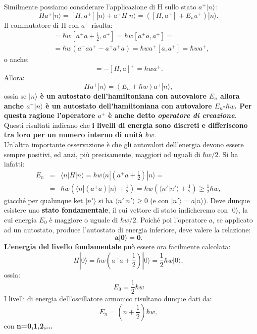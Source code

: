 \documentclass[a4paper,12pt,oneside]{book}
\begin{document}
 Similmente possiamo considerare l'applicazione di H sullo stato $a^+|n\rangle$:
	\begin{equation}
		Ha^+|n\rangle= [H,a^+]|n\rangle+a^+H|n\rangle=([H,a^+]+E_na^+)|n\rangle.
	\end{equation}
Il commutatore di H con $a^+$ risulta:
	\begin{align}
		[H,a^+]&= \hbar w[a^+a+\frac{1}{2},a^+]=\hbar w [a^+a,a^+]= \nonumber\\
		&= \hbar w (a^+aa^+-a^+a^+a)=\hbar w a^+ [a,a^+]=\hbar wa^+,
	\end{align}
o anche:
\begin{equation}
[H,a^+]=-[H,a]^+=\hbar w a^+.
\end{equation}
Allora:
\begin{equation}
Ha^+|n\rangle=(E_n+\hbar w)a^+|n\rangle,
\end{equation}
ossia se \textbf{$|n\rangle$ è un autostato dell'hamiltoniana con autovalore $E_n$ allora anche $a^+|n\rangle$ è  un autostato dell'hamiltoniana con autovalore $E_n$-$\hbar w$. Per questa ragione l'operatore $a^+$ è anche detto \textit{operatore di creazione}}. \\ 
 Questi risultati indicano che \textbf{i livelli di energia sono discreti e differiscono tra loro per un numero interno di unità $\hbar w$}.\\
 Un'altra importante osservazione è che gli autovalori dell'energia devono essere sempre positivi, ed anzi, più precisamente, maggiori od uguali di $\hbar w/2$. Si ha infatti:
\begin{eqnarray}
	E_n&=&\langle n|H|n \rangle= \hbar w \langle n|(a^+a+\frac{1}{2})|n\rangle= \nonumber \\
	&=&\hbar w (\langle n|(a^+a)|n\rangle+\frac{1}{2})=\hbar w (\langle n'|n'\rangle+\frac{1}{2}) \geq \frac{1}{2} \hbar w, 
\end{eqnarray}
giacché per qualunque ket $|n'\rangle$ si ha $\langle n'|n' \rangle\geq 0$ (e con $|n'\rangle= a|n\rangle$).
Deve dunque esistere uno \textbf{stato fondamentale}, il cui vettore di stato indicheremo con $|0\rangle$, la cui energia $E_0$ è maggiore o uguale di $\hbar w/2$. Poiché poi l'operatore $a$, se applicato ad un autostato, produce l'autostato di energia inferiore, deve valere la relazione:
\begin{equation}  \label{eq:cap11_7}
\mathbf{a|0\rangle=0}.
\end{equation}
 \textbf{L'energia del livello fondamentale} può essere ora facilmente calcolata:
\begin{equation}
H|0\rangle= \hbar w(a^+a+\frac{1}{2})|0\rangle= \frac{1}{2} \hbar w |0\rangle,
\end{equation}
ossia:
\begin{equation}
E_0=\frac{1}{2} \hbar w
\end{equation}
 I livelli di energia dell'oscillatore armonico risultano dunque dati da:
\begin{equation}
  \label{eq:cap11_8}
E_n=(n+\frac{1}{2}) \hbar w ,
\end{equation}
con   \textbf{n=0,1,2,...}
\end{document}
